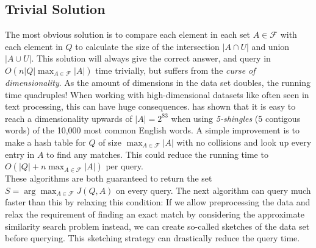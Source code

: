 \subsection{Trivial Solution}
The most obvious solution is to compare each element in each set $A\in \mathcal{F}$ with each element in $Q$ to calculate the size of the intersection $|A\cap U|$ and union $|A \cup U|$. This solution will always give the correct answer, and query in $O(n|Q|\max_{A\in \mathcal{F}}|A|)$ time trivially, but suffers from the \textit{curse of dimensionality}. As the amount of dimensions in the data set doubles, the running time quadruples! When working with high-dimensional datasets like often seen in text processing, this can have huge consequences. \citet{li2011hashing} has shown that it is easy to reach a dimensionality upwards of $|A|=2^{83}$ when using \textit{5-shingles} (5 contigous words) of the 10,000 most common English words.
A simple improvement is to make a hash table for $Q$ of size $\max_{A\in \mathcal{F}}|A|$ with no collisions and look up every entry in $A$ to find any matches. This could reduce the running time to $O(|Q|+n\max_{A\in \mathcal{F}}|A|)$ per query.\\
These algorithms are both guaranteed to return the set $S=\arg\max_{A \in \mathcal{F}}J(Q,A)$ on every query. The next algorithm can query much faster than this by relaxing this condition: If we allow preprocessing the data and relax the requirement of finding an exact match by considering the approximate similarity search problem instead, we can create so-called sketches of the data set before querying. This sketching strategy can drastically reduce the query time.
